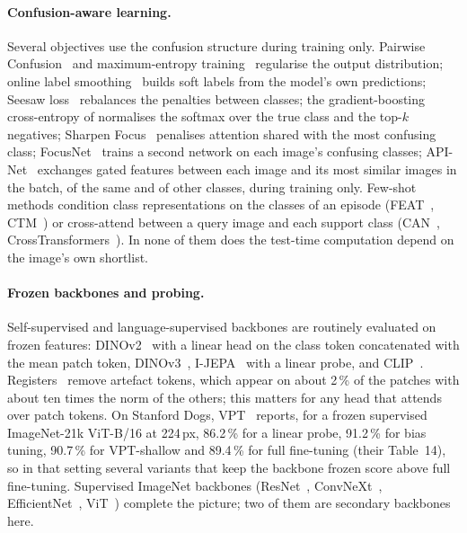 \documentclass[11pt,a4paper]{article}
\theoremstyle{plain}
\begin{document}
\paragraph{Confusion-aware learning.}
Several objectives use the confusion structure during training only. Pairwise Confusion~\citep{dubey2018pc} and
maximum-entropy training~\citep{dubey2018maxent} regularise the output distribution; online label
smoothing~\citep{zhang2021ols} builds soft labels from the model's own predictions; Seesaw loss~\citep{wang2021seesaw}
rebalances the penalties between classes; the gradient-boosting cross-entropy of \citet{sun2020gradientboosting}
normalises the softmax over the true class and the top-$k$ negatives; Sharpen Focus~\citep{wang2019sharpenfocus}
penalises attention shared with the most confusing class; FocusNet~\citep{zhang2022focusnet} trains a second network
on each image's confusing classes; API-Net~\citep{zhuang2020apinet} exchanges gated features between each image and
its most similar images in the batch, of the same and of other classes, during training only. Few-shot methods condition class representations on the classes of an episode
(FEAT~\citep{ye2020feat}, CTM~\citep{li2019ctm}) or cross-attend between a query image and each support class
(CAN~\citep{hou2019can}, CrossTransformers~\citep{doersch2020crosstransformers}). In none of them does the test-time
computation depend on the image's own shortlist.

\paragraph{Frozen backbones and probing.}
Self-supervised and language-supervised backbones are routinely evaluated on frozen features: DINOv2~\citep{oquab2024dinov2}
with a linear head on the class token concatenated with the mean patch token, DINOv3~\citep{simeoni2025dinov3},
I-JEPA~\citep{assran2023ijepa} with a linear probe, and CLIP~\citep{radford2021clip}. Registers~\citep{darcet2024registers}
remove artefact tokens, which appear on about 2\,\% of the patches with about ten times the norm of the others; this
matters for any head that attends over patch tokens. On Stanford Dogs, VPT~\citep{jia2022vpt} reports, for a frozen
supervised ImageNet-21k ViT-B/16 at 224\,px, 86.2\,\% for a linear probe, 91.2\,\% for bias tuning, 90.7\,\% for
VPT-shallow and 89.4\,\% for full fine-tuning (their Table~14), so in that setting several variants that keep the
backbone frozen score above full fine-tuning. Supervised ImageNet backbones (ResNet~\citep{he2016resnet},
ConvNeXt~\citep{liu2022convnext}, EfficientNet~\citep{tan2019efficientnet}, ViT~\citep{dosovitskiy2021vit}) complete
the picture; two of them are secondary backbones here.
\end{document}
